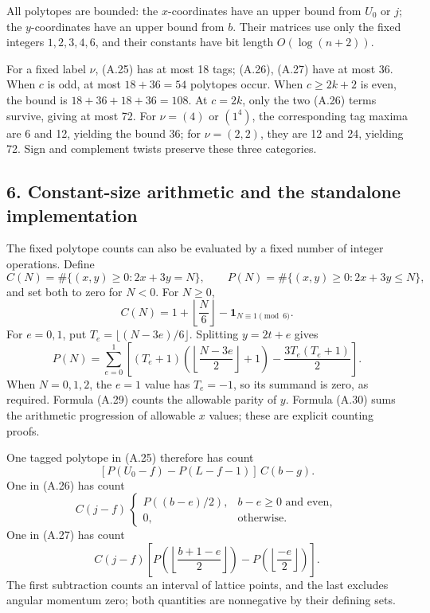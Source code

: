 \documentclass[
  10pt,
]{article}
\begin{document}
All polytopes are bounded: the \(x\)-coordinates have an upper bound
from \(U_0\) or \(j\); the \(y\)-coordinates have an upper bound from
\(b\). Their matrices use only the fixed integers \(1,2,3,4,6\), and
their constants have bit length \(O(\log(n+2))\).

For a fixed label \(\nu\), (A.25) has at most 18 tags; (A.26), (A.27)
have at most 36. When \(c\) is odd, at most \(18+36=54\) polytopes
occur. When \(c\ge2k+2\) is even, the bound is \(18+36+18+36=108\). At
\(c=2k\), only the two (A.26) terms survive, giving at most 72. For
\(\nu=(4)\) or \((1^4)\), the corresponding tag maxima are 6 and 12,
yielding the bound 36; for \(\nu=(2,2)\), they are 12 and 24, yielding
72. Sign and complement twists preserve these three categories.

\subsection{6. Constant-size arithmetic and the standalone
implementation}\label{constant-size-arithmetic-and-the-standalone-implementation}

The fixed polytope counts can also be evaluated by a fixed number of
integer operations. Define \[
C(N)=\#\{(x,y)\ge0:2x+3y=N\},\qquad
P(N)=\#\{(x,y)\ge0:2x+3y\le N\},
\] and set both to zero for \(N<0\). For \(N\ge0\), \[
C(N)=1+\left\lfloor\frac N6\right\rfloor
-\mathbf1_{N\equiv1\pmod6}.
\tag{A.29}
\] For \(e=0,1\), put \(T_e=\lfloor(N-3e)/6\rfloor\). Splitting
\(y=2t+e\) gives \[
P(N)=\sum_{e=0}^1
\left[
(T_e+1)\left(\left\lfloor\frac{N-3e}{2}\right\rfloor+1\right)
-\frac{3T_e(T_e+1)}2
\right].
\tag{A.30}
\] When \(N=0,1,2\), the \(e=1\) value has \(T_e=-1\), so its summand is
zero, as required. Formula (A.29) counts the allowable parity of \(y\).
Formula (A.30) sums the arithmetic progression of allowable \(x\)
values; these are explicit counting proofs.

One tagged polytope in (A.25) therefore has count \[
[P(U_0-f)-P(L-f-1)]\,C(b-g).
\] One in (A.26) has count \[
C(j-f)\,
\begin{cases}
P((b-e)/2),&b-e\ge0\text{ and even},\\
0,&\text{otherwise}.
\end{cases}
\] One in (A.27) has count \[
C(j-f)\left[
P\!\left(\left\lfloor\frac{b+1-e}{2}\right\rfloor\right)
-P\!\left(\left\lfloor\frac{-e}{2}\right\rfloor\right)
\right].
\tag{A.31}
\] The first subtraction counts an interval of lattice points, and the
last excludes angular momentum zero; both quantities are nonnegative by
their defining sets.
\end{document}
